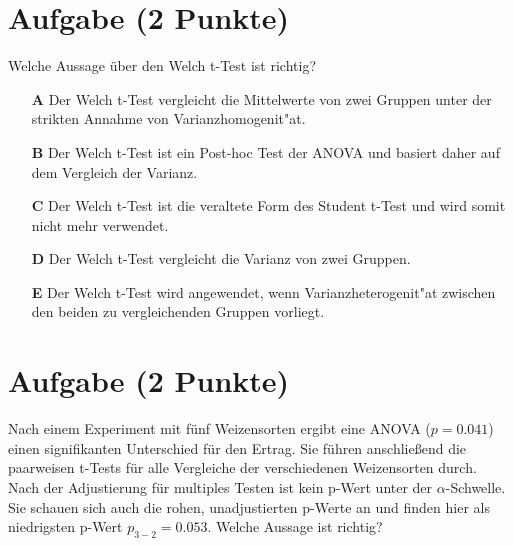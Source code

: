 \documentclass[a4paper, 10pt]{scrartcl}\usepackage[]{graphicx}\usepackage[]{xcolor}
\begin{document}
\section{Aufgabe \hfill (2 Punkte)}

Welche Aussage {\"u}ber den Welch t-Test ist richtig?



\begin{enumerate}
\item [\textbf{A} \msquare] Der Welch t-Test vergleicht die Mittelwerte von zwei Gruppen unter der strikten Annahme von Varianzhomogenit{"a}t.
\item [\textbf{B} \msquare] Der Welch t-Test ist ein Post-hoc Test der ANOVA und basiert daher auf dem Vergleich der Varianz.
\item [\textbf{C} \msquare] Der Welch t-Test ist die veraltete Form des Student t-Test und wird somit nicht mehr verwendet.
\item [\textbf{D} \msquare] Der Welch t-Test vergleicht die Varianz von zwei Gruppen.
\item [\textbf{E} \msquare] Der Welch t-Test wird angewendet, wenn Varianzheterogenit{"a}t zwischen den beiden zu vergleichenden Gruppen vorliegt.
\end{enumerate}  

\section{Aufgabe \hfill (2 Punkte)}

Nach einem Experiment mit f{\"u}nf Weizensorten ergibt eine ANOVA ($p = 0.041$)
einen signifikanten Unterschied f{\"u}r den Ertrag. Sie f{\"u}hren anschlie{\ss}end die
paarweisen t-Tests f{\"u}r alle Vergleiche der verschiedenen Weizensorten
durch. Nach der Adjustierung f{\"u}r multiples Testen ist kein p-Wert unter der
$\alpha$-Schwelle. Sie schauen sich auch die rohen, unadjustierten p-Werte
an und finden hier als niedrigsten p-Wert $p_{3-2} = 0.053$. Welche Aussage
ist richtig? 
\end{document}
